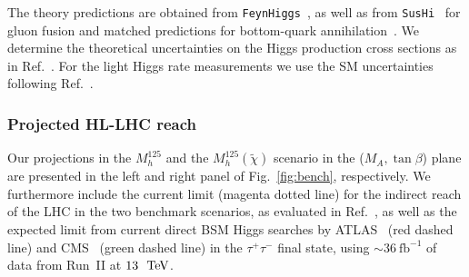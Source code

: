 The theory predictions are obtained from
\texttt{FeynHiggs}~\cite{Heinemeyer:1998yj,Heinemeyer:1998np,Degrassi:2002fi,Frank:2006yh,Hahn:2013ria,Bahl:2016brp,Bahl:2017aev,Bahl:2018qog},
as well as from \texttt{SusHi}~\cite{Harlander:2012pb, Harlander:2016hcx,
Harlander:2005rq,Harlander:2002wh,
Harlander:2002vv,Anastasiou:2014lda,Anastasiou:2015yha,
Anastasiou:2016cez,Degrassi:2010eu, Degrassi:2011vq,
Degrassi:2012vt,Actis:2008ug}
for gluon fusion and matched predictions for bottom-quark
annihilation~\cite{Bonvini:2015pxa,Bonvini:2016fgf,Forte:2015hba, Forte:2016sja}. We determine the theoretical uncertainties on the Higgs production cross sections as in Ref.~\cite{Bahl:2018zmf}. 
For the light Higgs rate measurements we use the SM uncertainties following Ref.~\cite{deFlorian:2016spz}.

\subsubsection*{Projected HL-LHC reach}
 
Our projections in the $M_h^{125}$ and the $M_h^{125}(\tilde{\chi})$ scenario in the
($M_A, \tan\beta$) plane are presented in the left and right panel of Fig.~\ref{fig:bench}, respectively. 
We furthermore include the current limit (magenta dotted line) for the indirect reach of the LHC in the two benchmark scenarios, as evaluated in Ref.~\cite{Bahl:2018zmf}, as well as the expected limit from current direct BSM Higgs searches by ATLAS~\cite{Aaboud:2017sjh} (red dashed line) and CMS~\cite{Sirunyan:2018zut} (green dashed line) in the $\tau^+\tau^-$ final state, using $\sim 36~\mathrm{fb}^{-1}$ of data from Run~II at $13~\mathrm{~\text{TeV}}$.

